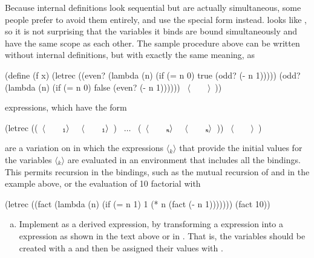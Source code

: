 \begin{exerciseGroup}
\label{Exercise 4.20}
 Because internal definitions look
sequential but are actually simultaneous, some people prefer to avoid them
entirely, and use the special form  instead.   looks
like , so it is not surprising that the variables it binds are bound
simultaneously and have the same scope as each other.  The sample procedure
 above can be written without internal definitions, but with exactly
the same meaning, as

\begin{codeBlock}
(define (f x)
  (letrec
    ((even? (lambda (n)
              (if (= n 0) true  (odd?  (- n 1)))))
     (odd?  (lambda (n)
              (if (= n 0) false (even? (- n 1))))))
    ~\(\langle \)~~~~\(\rangle \)~))
\end{codeBlock}

 expressions, which have the form

\begin{codeBlock}
(letrec ((~\(\langle \)~~~~\(_{\mono{1}}\rangle \)~ ~\(\langle \)~~~~\(_{\mono{1}}\rangle \)~) ~\( \dots \)~ (~\(\langle \)~~~~\(_{\monoItalic{n}}\rangle \)~ ~\(\langle \)~~~~\(_{\monoItalic{n}}\rangle \)~))
  ~\(\langle \)~~~~\(\rangle \)~)
\end{codeBlock}

\noindent
are a variation on  in which the expressions
\( \langle \)\( _k\rangle \) that provide the initial values for the
variables \( \langle \)\( _k\rangle \) are evaluated in an environment
that includes all the  bindings.  This permits recursion in the
bindings, such as the mutual recursion of  and  in the
example above, or the evaluation of 10 factorial with

\begin{codeBlock}
(letrec
  ((fact (lambda (n)
           (if (= n 1) 1 (* n (fact (- n 1)))))))
  (fact 10))
\end{codeBlock}

\begin{enumerate}[a.]

\item
Implement  as a derived expression, by transforming a
 expression into a  expression as shown in the text
above or in .  That is, the  variables should
be created with a  and then be assigned their values with
.


\end{enumerate}
\end{exerciseGroup}
